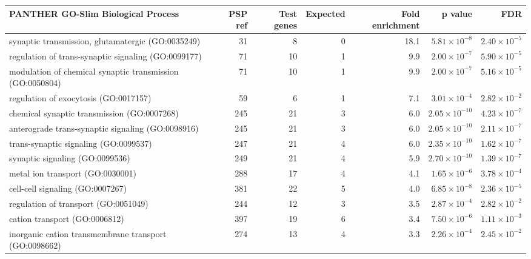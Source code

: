 \begin{table}[ht]
\centering
\begin{adjustbox}{width=\textwidth}

\begin{tabular}{lrrrrrr}
  \hline
PANTHER GO-Slim Biological Process & PSP ref & Test genes & Expected & Fold enrichment & p value & FDR \\ 
  \hline
synaptic transmission, glutamatergic (GO:0035249) & 31 & 8 & 0 & 18.1 & $5.81 \times 10^{-8}$ & $2.40 \times 10^{-5}$ \\ 
  regulation of trans-synaptic signaling (GO:0099177) & 71 & 10 & 1 & 9.9 & $2.00 \times 10^{-7}$ & $5.90 \times 10^{-5}$ \\ 
  modulation of chemical synaptic transmission (GO:0050804) & 71 & 10 & 1 & 9.9 & $2.00 \times 10^{-7}$ & $5.16 \times 10^{-5}$ \\ 
  regulation of exocytosis (GO:0017157) & 59 & 6 & 1 & 7.1 & $3.01 \times 10^{-4}$ & $2.82 \times 10^{-2}$ \\ 
  chemical synaptic transmission (GO:0007268) & 245 & 21 & 3 & 6.0 & $2.05 \times 10^{-10}$ & $4.23 \times 10^{-7}$ \\ 
  anterograde trans-synaptic signaling (GO:0098916) & 245 & 21 & 3 & 6.0 & $2.05 \times 10^{-10}$ & $2.11 \times 10^{-7}$ \\ 
  trans-synaptic signaling (GO:0099537) & 247 & 21 & 4 & 6.0 & $2.35 \times 10^{-10}$ & $1.62 \times 10^{-7}$ \\ 
  synaptic signaling (GO:0099536) & 249 & 21 & 4 & 5.9 & $2.70 \times 10^{-10}$ & $1.39 \times 10^{-7}$ \\ 
  metal ion transport (GO:0030001) & 288 & 17 & 4 & 4.1 & $1.65 \times 10^{-6}$ & $3.78 \times 10^{-4}$ \\ 
  cell-cell signaling (GO:0007267) & 381 & 22 & 5 & 4.0 & $6.85 \times 10^{-8}$ & $2.36 \times 10^{-5}$ \\ 
  regulation of transport (GO:0051049) & 244 & 12 & 3 & 3.5 & $2.87 \times 10^{-4}$ & $2.82 \times 10^{-2}$ \\ 
  cation transport (GO:0006812) & 397 & 19 & 6 & 3.4 & $7.50 \times 10^{-6}$ & $1.11 \times 10^{-3}$ \\ 
  inorganic cation transmembrane transport (GO:0098662) & 274 & 13 & 4 & 3.3 & $2.26 \times 10^{-4}$ & $2.45 \times 10^{-2}$ \\ 

\end{tabular}
\end{adjustbox}
\end{table}
